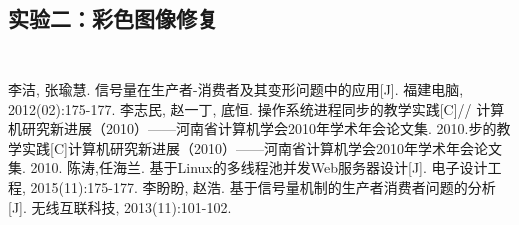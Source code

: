 \documentclass[withoutpreface,bwprint]{cumcmthesis} %
\begin{document}
\begin{appendices}
\section{实验二：彩色图像修复}
\begin{lstlisting}[language=python]
   
\end{lstlisting}
\end{appendices}
\begin{thebibliography}{9}%
    李洁, 张瑜慧. 信号量在生产者-消费者及其变形问题中的应用[J]. 福建电脑, 2012(02):175-177.
    李志民, 赵一丁, 底恒. 操作系统进程同步的教学实践[C]// 计算机研究新进展（2010）——河南省计算机学会2010年学术年会论文集. 2010.步的教学实践[C]计算机研究新进展（2010）——河南省计算机学会2010年学术年会论文集. 2010.
    陈涛,任海兰. 基于Linux的多线程池并发Web服务器设计[J]. 电子设计工程, 2015(11):175-177.
    李盼盼, 赵浩. 基于信号量机制的生产者消费者问题的分析[J]. 无线互联科技, 2013(11):101-102.
\end{thebibliography}
\end{document}
